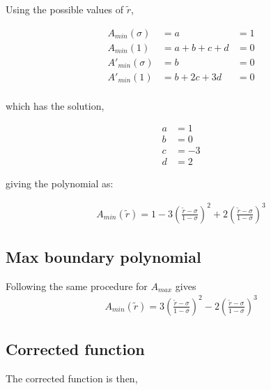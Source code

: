 \documentclass[a4paper]{article}
\begin{document}
Using the possible values of $\widetilde{r}$,

\begin{align*}
    A_{min}(\sigma) &= a &= 1 \\
    A_{min}(1) &= a + b + c + d  &= 0 \\
    A'_{min}(\sigma) &=  b    &= 0 \\
    A'_{min}(1) &=  b + 2 c + 3 d    &= 0 \\
\end{align*}


which has the solution,

\begin{align*}
    a &= 1 \\
    b &= 0 \\
    c &= -3 \\
    d &= 2 
\end{align*}

giving the polynomial as: 

\begin{align*}
    A_{min} (\widetilde{r}) = 1 - 3 \left(  \frac{\widetilde{r} - \sigma }{ 1 - \sigma}\right)^2 +
    2 \left( \frac{\widetilde{r} - \sigma}{1 - \sigma} \right)^3 
\end{align*}
\subsection{Max boundary polynomial}
Following the same procedure for $A_{max}$ gives 
\begin{align*}
    A_{min} (\widetilde{r}) = 3 \left(  \frac{\widetilde{r} - \sigma }{ 1 - \sigma}\right)^2 -
    2 \left( \frac{\widetilde{r} - \sigma}{1 - \sigma} \right)^3
\end{align*}
\subsection{Corrected function} 

The corrected function is then, 
\end{document}
